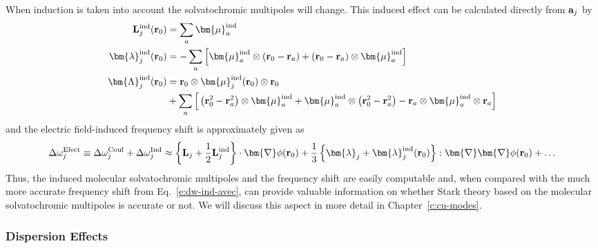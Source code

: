 \documentclass[a4paper,titlepage,twoside,fleqn,12pt]{book}
\newcommand{\BM}[1]{\bm{#1}}
\begin{document}
\begin{refsection}
When induction is taken into account the solvatochromic multipoles
will change. This induced effect can be calculated directly from
${\bf a}_j$ by
%
\begin{subequations}
\begin{align}
{\bf L}_j^{\rm ind}({\bf r}_0)       &=   \sum_a {\BM \mu}_a^{\rm ind} \label{e:34e1} \\
{\BM \lambda}_j^{\rm ind}({\bf r}_0) &= - \sum_a \Big[ {\BM \mu}_a^{\rm ind} \otimes \left( {\bf r}_0 
                                       - {\bf r}_a \right) + \left( {\bf r}_0 
                                       - {\bf r}_a \right) \otimes {\BM \mu}_a^{\rm ind} \Big] \label{e:34e2} \\
{\BM \Lambda}_j^{\rm ind}({\bf r}_0) &=   {\bf r}_0 \otimes {\BM \mu}_j^{\rm ind}({\bf r}_0) \otimes {\bf r}_0 \nonumber \\ 
                                    &  + \sum_a \Big[ \left( {\bf r}_0^2 - {\bf r}_a^2 \right) \otimes {\BM \mu}_a^{\rm ind} 
                                       + {\BM \mu}_a^{\rm ind} \otimes \left( {\bf r}_0^2 - {\bf r}_a^2 \right) 
                                       - {\bf r}_a \otimes {\BM \mu}_a^{\rm ind} \otimes {\bf r}_a \Big] \label{e:34e3}
\end{align}
\end{subequations}
%
and the electric field\hyp{}induced frequency shift 
is approximately given as
%
\begin{equation} \label{e:dmtp-solmmm-ind}
 \Delta\omega_j^{\rm Elect} \equiv  \Delta\omega_j^{\rm Coul} +  \Delta\omega_j^{\rm Ind} \approx  
                       \left\{ {\bf L}_j + \frac{1}{2} {\bf L}_j^{\rm ind} \right\} 
                       \cdot {\BM \nabla} \phi({\bf r}_0)   + 
      \frac{1}{3} \left\{ {\BM \lambda}_j + {\BM \lambda}_j^{\rm ind}({\bf r}_0) \right\} 
                           : {\BM \nabla}  {\BM \nabla} \phi({\bf r}_0)   +   \ldots
\end{equation}
%
Thus, the induced molecular solvatochromic multipoles and the frequency shift
are easily computable and, when compared with the much more accurate
frequency shift from Eq.~\eqref{e:dw-ind-avec}, can provide valuable 
information on whether Stark theory based on the molecular
solvatochromic multipoles is accurate or not. We will discuss 
this aspect in more detail in Chapter~\ref{c:cn-modes}.

\subsubsection{Dispersion Effects\label{s:disp}}


\end{refsection}
\end{document}
